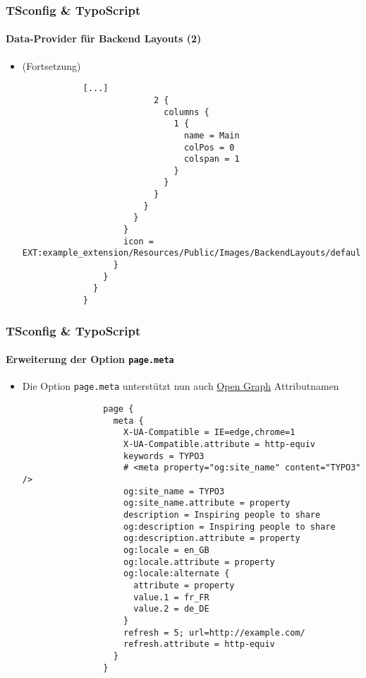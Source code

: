 \begin{frame}[fragile]
	\frametitle{TSconfig \& TypoScript}
	\framesubtitle{Data-Provider für Backend Layouts (2)}

	\lstset{basicstyle=\tiny\ttfamily}

	\begin{itemize}
		\item \smaller(Fortsetzung)\normalsize
		\begin{lstlisting}
			[...]
			              2 {
			                columns {
			                  1 {
			                    name = Main
			                    colPos = 0
			                    colspan = 1
			                  }
			                }
			              }
			            }
			          }
			        }
			        icon = EXT:example_extension/Resources/Public/Images/BackendLayouts/default.gif
			      }
			    }
			  }
			}
		\end{lstlisting}
	\end{itemize}

\end{frame}


\begin{frame}[fragile]
	\frametitle{TSconfig \& TypoScript}
	\framesubtitle{Erweiterung der Option \texttt{page.meta}}

	\lstset{basicstyle=\tiny\ttfamily}

	\begin{itemize}

		\item Die Option \texttt{page.meta} unterstützt nun auch \href{http://ogp.me/}{Open Graph} Attributnamen

			\begin{lstlisting}
				page {
				  meta {
				    X-UA-Compatible = IE=edge,chrome=1
				    X-UA-Compatible.attribute = http-equiv
				    keywords = TYPO3
				    # <meta property="og:site_name" content="TYPO3" />
				    og:site_name = TYPO3
				    og:site_name.attribute = property
				    description = Inspiring people to share
				    og:description = Inspiring people to share
				    og:description.attribute = property
				    og:locale = en_GB
				    og:locale.attribute = property
				    og:locale:alternate {
				      attribute = property
				      value.1 = fr_FR
				      value.2 = de_DE
				    }
				    refresh = 5; url=http://example.com/
				    refresh.attribute = http-equiv
				  }
				}
			\end{lstlisting}

	\end{itemize}

\end{frame}

